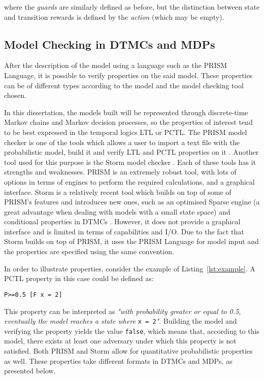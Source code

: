 where the \textit{guards} are similarly defined as before, but the distinction between state and transition rewards is defined by the \textit{action} (which may be empty).

\subsection{Model Checking in DTMCs and MDPs}

After the description of the model using a language such as the PRISM Language, it is possible to verify properties on the said model. These properties can be of different types according to the model and the model checking tool chosen. 

In this dissertation, the models built will be represented through discrete-time Markov chains and Markov decision processes, so the properties of interest tend to be best expressed in the temporal logics LTL or PCTL. The PRISM model checker is one of the tools which allows a user to import a text file with the probabilistic model, build it and verify LTL and PCTL properties on it \cite{prism}. Another tool used for this purpose is the Storm model checker \cite{storm}. Each of these tools has it strengths and weaknesses. PRISM is an extremely robust tool, with lots of options in terms of engines to perform the required calculations, and a graphical interface. Storm is a relatively recent tool which builds on top of some of PRISM's features and introduces new ones, such as an optimised Sparse engine (a great advantage when dealing with models with a small state space) and conditional properties in DTMCs \cite{storm}. However, it does not provide a graphical interface and is limited in terms of capabilities and I/O. Due to the fact that Storm builds on top of PRISM, it uses the PRISM Language for model input and the properties are specified using the same convention.

In order to illustrate properties, consider the example of Listing~\ref{lst:example}. A PCTL property in this case could be defined as:

\begin{minipage}{\linewidth}
{\vspace{1em}
\begin{lstlisting}
P>=0.5 [F x = 2]
\end{lstlisting}
}
\end{minipage}

This property can be interpreted as \textit{"with probability greater or equal to 0.5, eventually the model reaches a state where }\texttt{x = 2}\textit{"}. Building the model and verifying the property yields the value \texttt{false}, which means that, according to this model, there exists at least one adversary under which this property is not satisfied. Both PRISM and Storm allow for quantitative probabilistic properties as well. These properties take different formats in DTMCs and MDPs, as presented below.


